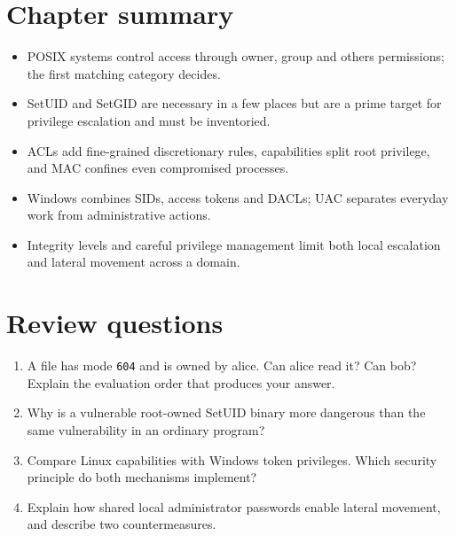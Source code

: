 \section*{Chapter summary}
\begin{itemize}
  \item POSIX systems control access through owner, group and others permissions; the first matching category decides.
  \item SetUID and SetGID are necessary in a few places but are a prime target for privilege escalation and must be inventoried.
  \item ACLs add fine-grained discretionary rules, capabilities split root privilege, and MAC confines even compromised processes.
  \item Windows combines SIDs, access tokens and DACLs; UAC separates everyday work from administrative actions.
  \item Integrity levels and careful privilege management limit both local escalation and lateral movement across a domain.
\end{itemize}

\section*{Review questions}
\begin{enumerate}
  \item A file has mode \texttt{604} and is owned by alice. Can alice read it? Can bob? Explain the evaluation order that produces your answer.
  \item Why is a vulnerable root-owned SetUID binary more dangerous than the same vulnerability in an ordinary program?
  \item Compare Linux capabilities with Windows token privileges. Which security principle do both mechanisms implement?
  \item Explain how shared local administrator passwords enable lateral movement, and describe two countermeasures.
\end{enumerate}
